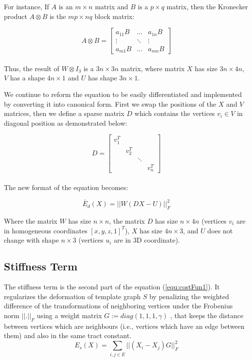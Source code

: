\documentclass[../structure.tex]{subfiles}
\begin{document}
For instance, If $A$ is an $m \times n$ matrix and $B$ is a $p \times q$ matrix, then the Kronecker product $A \otimes B$ is the $mp \times nq$ block matrix:

\begin{equation*}
A \otimes B =
\begin{bmatrix}
a_{11}B & \dots  & a_{1n}B \\
\vdots  & \ddots & \vdots  \\
a_{m1}B & \dots  & a_{mn}B
\end{bmatrix}
\end{equation*}\\

Thus, the result of $W \otimes I_{3}$ is a $3n\times 3n$ matrix, where matrix $X$ has size $3n\times4n$, $V$ has a shape $4n\times1$ and $U$ has shape $3n\times1$.

We continue to reform the equation to be easily differentiated and implemented by converting it into canonical form. First we swap the positions of the $X$ and $V$ matrices, then we define a sparse matrix $D$ which contains the vertices $v_{i} \in V$ in diagonal position as demonstrated below:

\begin{equation}
D =
\begin{bmatrix}
v_{1}^T & & & \\
& v_{2}^T & & \\
& & \ddots & \\
& & & v_{n}^T
\end{bmatrix}
\label{equ:matD}
\end{equation}\\

The new format of the equation becomes:

\begin{equation}
\bar{E}_{d}(X) = ||W(DX-U)||_{F}^2
\label{equ:distance4}
\end{equation}

\hspace{2em}Where the matrix $W$ has size $n\times n$, the matrix $D$ has size $n\times 4n$ (vertices $v_{i}$ are in homogeneous coordinates $[x,y,z,1]^T$), $X$ has size $4n\times 3$, and $U$ does not change with shape $n\times 3$ (vertices $u_{i}$ are in 3D coordinate).

\subsection{Stiffness Term}
\hspace{2em}The stiffness term is the second part of the equation (\ref{equ:costFun1}). It regularizes the deformation of template graph $S$ by penalizing the weighted difference of the transformations of neighboring vertices under the Frobenius norm $||.||_{F}$ using a weight matrix $G := diag(1, 1, 1, \gamma)$ \cite{Amberg2007}, that keeps the distance between vertices which are neighbours (i.e., vertices which have an edge between them) and also in the same tract constant.
\begin{equation}
E_{s}(X) = \sum_{i,j \in E} ||(X_{i} - X_{j})G||_{F}^2
\label{equ:stiffness1}
\end{equation}
\end{document}
